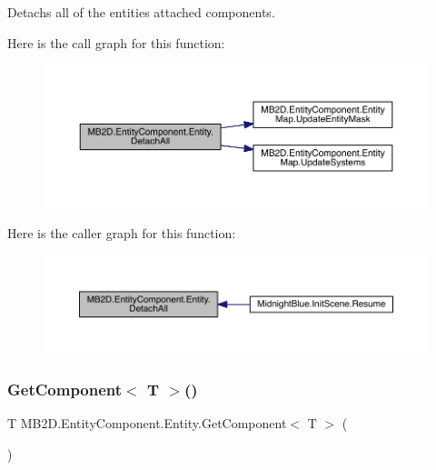 Detachs all of the entities attached components. 

Here is the call graph for this function\+:\nopagebreak
\begin{figure}[H]
\begin{center}
\leavevmode
\includegraphics[width=350pt]{class_m_b2_d_1_1_entity_component_1_1_entity_a5c006a368383ba7b17653d9f958ceaf8_cgraph}
\end{center}
\end{figure}
Here is the caller graph for this function\+:\nopagebreak
\begin{figure}[H]
\begin{center}
\leavevmode
\includegraphics[width=350pt]{class_m_b2_d_1_1_entity_component_1_1_entity_a5c006a368383ba7b17653d9f958ceaf8_icgraph}
\end{center}
\end{figure}
\hypertarget{class_m_b2_d_1_1_entity_component_1_1_entity_a637f3b4df5ecd5d4e6c7630740d1676f}{}\label{class_m_b2_d_1_1_entity_component_1_1_entity_a637f3b4df5ecd5d4e6c7630740d1676f} 
\subsubsection{\texorpdfstring{Get\+Component$<$ T $>$()}{GetComponent< T >()}}
{\footnotesize\ttfamily T M\+B2\+D.\+Entity\+Component.\+Entity.\+Get\+Component$<$ T $>$ (\begin{DoxyParamCaption}{ }\end{DoxyParamCaption})\hspace{0.3cm}{\ttfamily [inline]}}




